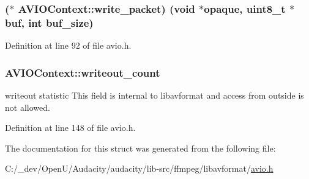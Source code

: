 \subsubsection[{\texorpdfstring{write\+\_\+packet}{write_packet}}]{($\ast$ A\+V\+I\+O\+Context\+::write\+\_\+packet) ({\bf void} $\ast${\bf opaque}, {\bf uint8\+\_\+t} $\ast${\bf buf}, {\bf int} buf\+\_\+size)}\hypertarget{struct_a_v_i_o_context_afb1f05f0e4e957090ccc23f0b82a0b08}{}\label{struct_a_v_i_o_context_afb1f05f0e4e957090ccc23f0b82a0b08}


Definition at line 92 of file avio.\+h.

\subsubsection[{\texorpdfstring{writeout\+\_\+count}{writeout_count}}]{ A\+V\+I\+O\+Context\+::writeout\+\_\+count}\hypertarget{struct_a_v_i_o_context_ac027eace34bf1dbcab5f71b0806d1c8a}{}\label{struct_a_v_i_o_context_ac027eace34bf1dbcab5f71b0806d1c8a}
writeout statistic This field is internal to libavformat and access from outside is not allowed. 

Definition at line 148 of file avio.\+h.



The documentation for this struct was generated from the following file\+:\begin{DoxyCompactItemize}
\item 
C\+:/\+\_\+dev/\+Open\+U/\+Audacity/audacity/lib-\/src/ffmpeg/libavformat/\hyperlink{avio_8h}{avio.\+h}\end{DoxyCompactItemize}
